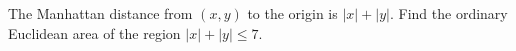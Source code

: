 The Manhattan distance from $(x,y)$ to the origin is $|x|+|y|$. Find the ordinary Euclidean area of the region $|x|+|y|\le7 $.
